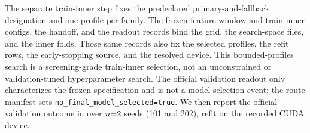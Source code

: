 The separate train-inner step fixes the predeclared primary-and-fallback
designation and one profile per family. The frozen feature-window and train-inner
configs, the handoff, and the readout records bind the grid, the search-space
files, and the inner folds. Those same records also fix the selected profiles,
the refit rows, the early-stopping source, and the resolved device. This
bounded-profiles search is a screening-grade train-inner selection, not an
unconstrained or validation-tuned hyperparameter search. The official validation readout only characterizes the
frozen specification and is not a model-selection event; the route manifest sets
\nolinkurl{no_final_model_selected=true}. We then report the official validation
outcome in \macrofone{} over $n{=}2{}$ seeds (101 and 202), refit on the
recorded CUDA device.
